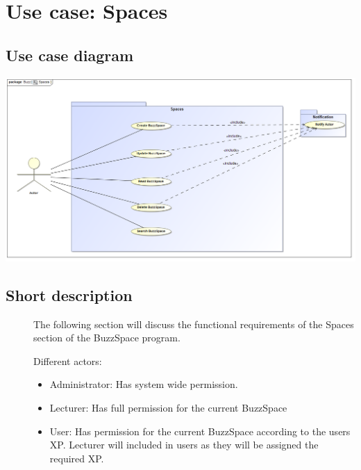\documentclass{article}
\begin{document}
	\section{Use case: Spaces}
	\subsection{Use case diagram}
	\includegraphics[width=\textwidth]{spacesUseCase}
	\subsection{Short description}
	\begin{description}
		
		\item[] 
			The following section will discuss the functional requirements of the Spaces section of the BuzzSpace program.
		
		\item[] Different actors:
		\begin{itemize}
			\item Administrator: Has system wide permission.
			\item Lecturer: Has full permission for the current BuzzSpace
			\item User: Has permission for the current BuzzSpace according to the users XP. Lecturer will included in users as they will be assigned the required XP.   
		\end{itemize}
		
	\end{description}
	
\end{document}
